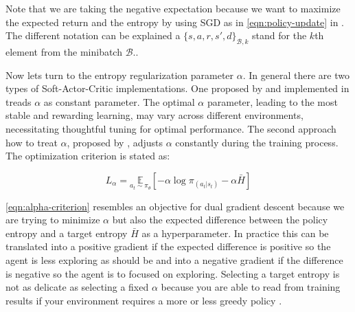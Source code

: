 Note that we are taking the negative expectation because we want to maximize the expected return and the entropy by using SGD as in \eqref{eqn:policy-update} in . The different notation can be explained a ${\{s, a, r, s', d\}}_{\mathcal{B}, k}$ stand for the $k$th element from the minibatch $\mathcal{B}$..

Now lets turn to the entropy regularization parameter $\alpha$. In general there are two types of Soft-Actor-Critic implementations. One proposed by \cite{SAC_Paper} and implemented in \cite{stable-baselines3} treads $\alpha$ as constant parameter.  The optimal $\alpha$ parameter, leading to the most stable and rewarding learning, may vary across different environments, necessitating thoughtful tuning for optimal performance.
The second approach how to treat $\alpha$, proposed by \cite{SAC_Applications_Paper}, adjusts $\alpha$ constantly during the training process. The optimization criterion is stated as:

\begin{equation}\label{eqn:alpha-criterion}
	L_\alpha = \underset{a_t\sim\pi_\theta}{\mathbb{E}}\left[-\alpha \log \pi_(a_t|s_t) - \alpha \bar{H}\right]
\end{equation}

\eqref{eqn:alpha-criterion} resembles an objective for dual gradient descent because we are trying to minimize $\alpha$ but also the expected difference between the policy entropy and a target entropy $\bar{H}$ as a hyperparameter. In practice this can be translated into a positive gradient if the expected difference is positive so the agent is less exploring as should be and into a negative gradient if the difference is negative so the agent is to focused on exploring. Selecting a target entropy is not as delicate as selecting a fixed $\alpha$ because you are able to read from training results if your environment requires a more or less greedy policy \cite{SpinningUp2018}.

